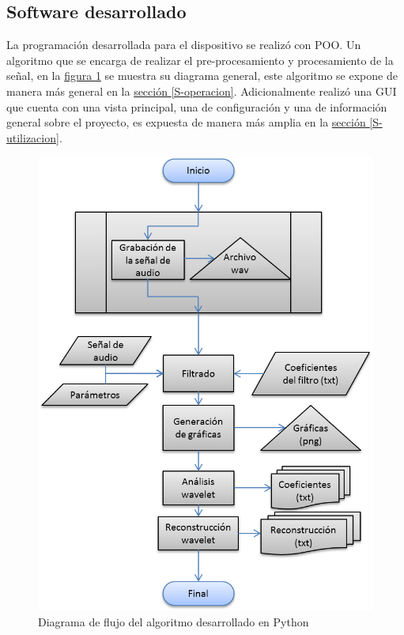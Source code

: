 \documentclass[11pt,lettersize]{article} %
\newcommand{\figura}[1]{\hyperref[{#1}]{figura \ref*{#1}}}
\newcommand{\seccion}[1]{\hyperref[{#1}]{sección \ref*{#1}}}
\begin{document}
\subsection{Software desarrollado}
\label{S-sw-des}
La programación desarrollada para el dispositivo se realizó con POO. Un algoritmo que se encarga de realizar el pre-procesamiento y procesamiento de la señal, en la \figura{F-diagrama-flujo} se muestra su diagrama general, este algoritmo se expone de manera más general en la \seccion{S-operacion}. Adicionalmente realizó una GUI que cuenta con una vista principal, una de configuración y una de información general sobre el proyecto, es expuesta de manera más amplia en la \seccion{S-utilizacion}.
\begin{figure}[h!]
	\centering
	\includegraphics[width=.6\textwidth]{images/diagrama-flujo.png}
	\caption{Diagrama de flujo del algoritmo desarrollado en Python}
	\label{F-diagrama-flujo}
\end{figure}



\end{document}
